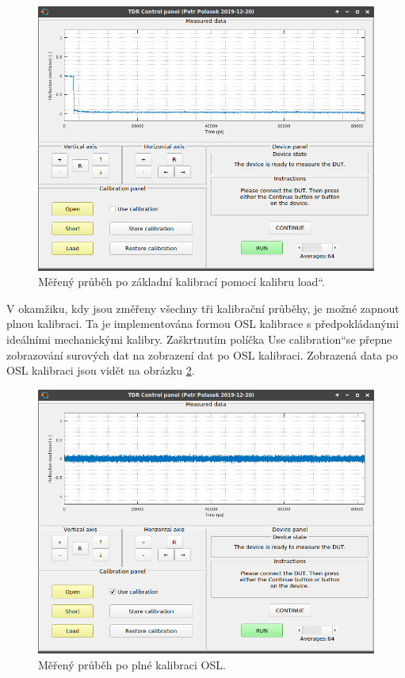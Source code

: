 \begin{figure}[htbp]
\includegraphics[width=\textwidth,keepaspectratio]{images/gui/calibrations_performed.png}\caption{Měřený průběh po základní kalibrací pomocí kalibru \quotedblbase load\textquotedblleft .}\label{calibrations_performed}
\end{figure}

V okamžiku, kdy jsou změřeny všechny tři kalibrační průběhy, je možné zapnout plnou kalibraci. Ta je implementována formou OSL kalibrace s předpokládanými ideálními mechanickými kalibry. Zaškrtnutím políčka \quotedblbase Use calibration\textquotedblleft se přepne zobrazování surových dat na zobrazení dat po OSL kalibraci. Zobrazená data po OSL kalibraci jsou vidět na obrázku \ref{calibration_applied_on_new_short}.

\begin{figure}[htbp]
\includegraphics[width=\textwidth,keepaspectratio]{images/gui/calibration_applied_on_new_short.png}\caption{Měřený průběh po plné kalibraci OSL.}\label{calibration_applied_on_new_short}
\end{figure}